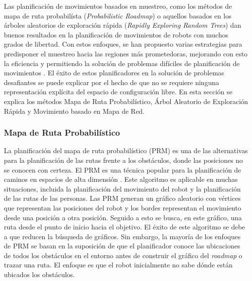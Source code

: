 Las planificación de movimientos basados en muestreo, como los métodos 
de mapa de ruta probabilísta (\textit{Probabilistic Roadmap}) o aquellos 
basados en los árboles aleatorios de exploración rápida 
(\textit{Rapidly Exploring Random Trees}) dan buenos resultados 
en la planificación de movimientos de robots con muchos grados de 
libertad. Con estos enfoques, se han propuesto varias estrategias para 
predisponer el muestreo hacia las regiones más prometedoras, mejorando 
con esto la eficiencia y permitiendo la solución de problemas difíciles 
de planificación de movimientos \cite{elbanhawi2014sampling}. El éxito 
de estos planificadores en la solución de problemas desafiantes se puede 
explicar por el hecho de que no se requiere ninguna representación 
explícita del espacio de configuración libre. En esta sección se 
explica los métodos Mapa de Ruta Probabilístico, Árbol Aleatorio de 
Exploración Rápida y Movimiento basado en Mapa de Red.

\subsubsection{Mapa de Ruta Probabil\'istico} %

La planificaci\'on del mapa de ruta probabil\'istico (PRM) es una de las 
alternativas para la planificaci\'on de las rutas frente a los  
obst\'aculos, donde las posiciones no se conocen con certeza. El PRM es una 
t\'ecnica popular para la planificaci\'on de caminos en espacios de alta 
dimensi\'on \cite{guibas1999probabilistic}. Este algoritmo es aplicable 
en muchas situaciones, incluida la planificaci\'on del movimiento del 
robot y la planificaci\'on de las rutas de las personas. Las PRM generan 
un gr\'afico aleatorio con v\'ertices que representan las posiciones del 
robot y los bordes representan el movimiento desde una posici\'on a otra 
posici\'on. Seguido a esto se busca, en este gr\'afico, una ruta desde el 
punto de inicio hacia el objetivo. El \'exito de este algoritmo se debe 
a que reducen la b\'usqueda de gr\'aficos. Sin embargo, la mayor\'ia de 
los enfoques de PRM se basan en la suposici\'on de que el planificador 
conoce las ubicaciones de todos los obst\'aculos en el entorno antes de 
construir el gr\'afico del \textit{roadmap} o trazar una ruta. El enfoque 
es que el robot inicialmente no sabe dónde est\'an ubicados los obst\'aculos.

